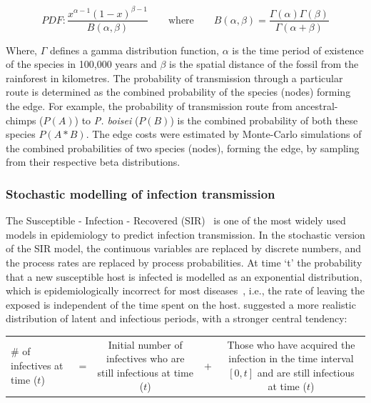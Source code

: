 \documentclass[fleqn,10pt]{wlscirep}
\begin{document}
\begin{equation}
PDF: \frac{x^{\alpha - 1}(1 - x)^{\beta - 1}}{B(\alpha, \beta)} \qquad \mathrm{where} \qquad B(\alpha, \beta) = \frac{\Gamma(\alpha)\Gamma(\beta)}{\Gamma(\alpha + \beta)}
\end{equation}

Where, $\Gamma$ defines a gamma distribution function, $\alpha$ is the time period of existence of the species in 100,000 years and $\beta$ is the spatial distance of the fossil from the rainforest in kilometres. The probability of transmission through a particular route is determined as the combined probability of the species (nodes) forming the edge. For example, the probability of transmission route from ancestral-chimps ($P(A)$) to \textit{P. boisei} ($P(B)$) is the combined probability of both these species $P(A*B)$. The edge costs were estimated by Monte-Carlo simulations of the combined probabilities of two species (nodes), forming the edge, by sampling from their respective beta distributions.
 

\subsubsection*{Stochastic modelling of infection transmission}
The Susceptible - Infection - Recovered (SIR)~\citep{Chen2008} is one of the most widely used models in epidemiology to predict infection transmission. In the stochastic version of the SIR model, the continuous variables are replaced by discrete numbers, and the process rates are replaced by process probabilities. At time ‘t’ the probability that a new susceptible host is infected is modelled as an exponential distribution, which is epidemiologically incorrect for most diseases~\citep{Wearing2005,Bailey1975,sartwell1950distribution}, i.e., the rate of leaving the exposed is independent of the time spent on the host. \citet{Wearing2005} suggested a more realistic distribution of latent and infectious periods, with a stronger central tendency:

\begin{table}[!h]
	\centering
	\renewcommand{\arraystretch}{1.5}
	\begin{tabulary}{\linewidth}{LCCCC}
		\# of infectives at time ($t$) & =  & 
		Initial number of infectives who are still infectious at time ($t$) & + & 
		Those who have acquired the infection in the time interval $[0, t]$ and are still infectious at time ($t$)			\\ 
	\end{tabulary}
\end{table}
\end{document}
